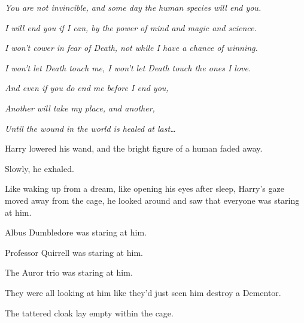\emph{You are not invincible, and some day the human species will end you.}

\emph{I will end you if I can, by the power of mind and magic and science.}

\emph{I won’t cower in fear of Death, not while I have a chance of winning.}

\emph{I won’t let Death touch me, I won’t let Death touch the ones I love.}

\emph{And even if you do end me before I end you,}

\emph{Another will take my place, and another,}

\emph{Until the wound in the world is healed at last…}

Harry lowered his wand, and the bright figure of a human faded away.

Slowly, he exhaled.

Like waking up from a dream, like opening his eyes after sleep, Harry’s gaze moved away from the cage, he looked around and saw that everyone was staring at him.

Albus Dumbledore was staring at him.

Professor Quirrell was staring at him.

The Auror trio was staring at him.

They were all looking at him like they’d just seen him destroy a Dementor.

The tattered cloak lay empty within the cage.
